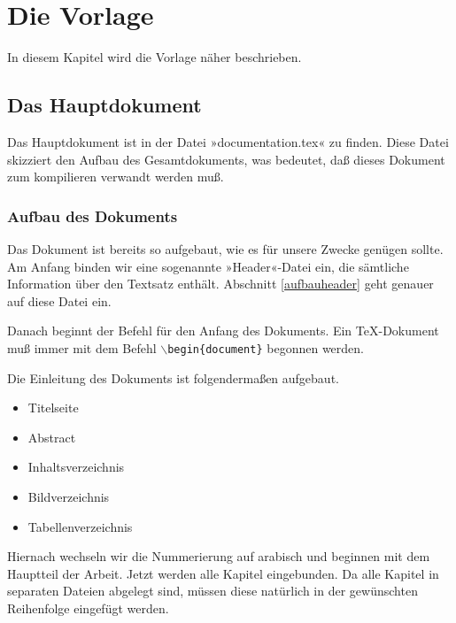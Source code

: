 \chapter{Die Vorlage}
\label{vorlage}
  
  In diesem Kapitel wird die Vorlage näher beschrieben.
  
  \section{Das Hauptdokument}
  \label{hauptdokument}

  Das Hauptdokument ist in der Datei »documentation.tex« zu finden. Diese Datei skizziert den Aufbau des Gesamtdokuments, was bedeutet, daß dieses Dokument zum kompilieren verwandt werden muß.
    
    \subsection{Aufbau des Dokuments}
    
    Das Dokument ist bereits so aufgebaut, wie es für unsere Zwecke genügen sollte. Am Anfang binden wir eine sogenannte »Header«-Datei ein, die sämtliche Information über den Textsatz enthält. Abschnitt \ref{aufbauheader} geht genauer auf diese Datei ein.
    
    
    Danach beginnt der Befehl für den Anfang des Dokuments. Ein TeX-Dokument muß immer mit dem Befehl \texttt{$\backslash$begin\{document\}} begonnen werden.
    
    Die Einleitung des Dokuments ist folgendermaßen aufgebaut.
    
    \begin{itemize}
      \item Titelseite
      \item Abstract
      \item Inhaltsverzeichnis
      \item Bildverzeichnis
      \item Tabellenverzeichnis
    \end{itemize}
    
    Hiernach wechseln wir die Nummerierung auf arabisch und beginnen mit dem Hauptteil der Arbeit. Jetzt werden alle Kapitel eingebunden. Da alle Kapitel in separaten Dateien abgelegt sind, müssen diese natürlich in der gewünschten Reihenfolge eingefügt werden.
    
